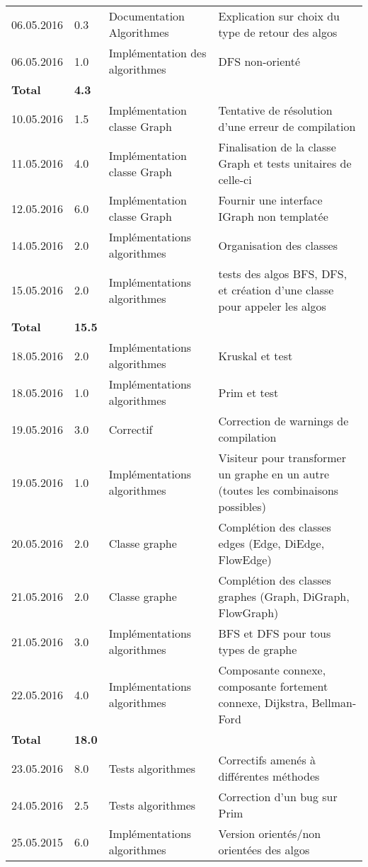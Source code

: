 \documentclass[french]{article}
\begin{document}
\begin{longtable}{p{}|p{}|p{}|p{}}
		06.05.2016 & 0.3 & Documentation Algorithmes & Explication sur choix du type de retour des algos\\
		06.05.2016 & 1.0 & Implémentation des algorithmes & DFS non-orienté\\
		\textbf{Total} & \textbf{4.3} &&\\
		\hline
		10.05.2016 & 1.5 & Implémentation classe Graph & Tentative de résolution d'une erreur de compilation\\
		11.05.2016 & 4.0 & Implémentation classe Graph & Finalisation de la classe Graph et tests unitaires de celle-ci \\
		12.05.2016 & 6.0 & Implémentation classe Graph & Fournir une interface IGraph non templatée \\
		14.05.2016 & 2.0 & Implémentations algorithmes & Organisation des classes \\
		15.05.2016 & 2.0 & Implémentations algorithmes & tests des algos BFS, DFS, et création d'une classe pour appeler les algos \\
		\textbf{Total} & \textbf{15.5} &&\\
		\hline
		18.05.2016 & 2.0 & Implémentations algorithmes & Kruskal et test\\
		18.05.2016 & 1.0 & Implémentations algorithmes & Prim et test\\
		19.05.2016 & 3.0 & Correctif & Correction de warnings de compilation\\
		19.05.2016 & 1.0 & Implémentations algorithmes & Visiteur pour transformer un graphe en un autre (toutes les combinaisons possibles)\\
		20.05.2016 & 2.0 & Classe graphe & Complétion des classes edges (Edge, DiEdge, FlowEdge)\\
		21.05.2016 & 2.0 & Classe graphe & Complétion des classes graphes (Graph, DiGraph, FlowGraph)\\
		21.05.2016 & 3.0 & Implémentations algorithmes & BFS et DFS pour tous types de graphe\\
		22.05.2016 & 4.0 & Implémentations algorithmes & Composante connexe, composante fortement connexe, Dijkstra, Bellman-Ford\\
		\textbf{Total} & \textbf{18.0} &&\\
		\hline
		23.05.2016 & 8.0 & Tests algorithmes & Correctifs amenés à différentes méthodes\\
		24.05.2016 & 2.5 & Tests algorithmes & Correction d'un bug sur Prim\\
		25.05.2015 & 6.0 & Implémentations algorithmes & Version orientés/non orientées des algos\\

\end{longtable}
\end{document}
